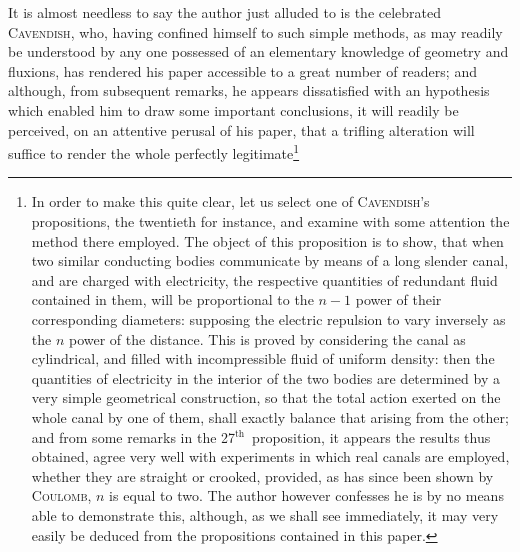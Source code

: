 \documentclass[12pt,notitlepage]{amsart}
\let\Person\textsc
\def\th{${}^\text{th}$\ }
\begin{document}
It is almost needless to say the author just alluded to is the celebrated
\Person{Cavendish}, who, having confined himself to such simple methods, as may
readily be understood by any one possessed of an elementary knowledge of
geometry and fluxions, has rendered his paper accessible to a great number
of readers; and although, from subsequent remarks, he appears dissatisfied
with an hypothesis which enabled him to draw some important conclusions,
it will readily be perceived, on an attentive perusal of his paper, that a trifling
alteration will suffice to render the whole perfectly legitimate\footnote{
In order to make this quite clear, let us select one of
\Person{Cavendish}'s propositions,
the twentieth for instance, and examine with some attention the method
there employed.
The object of this proposition is to show,
that when two similar conducting bodies communicate
by means of a long slender canal, and are charged with electricity,
the respective quantities of redundant fluid contained in them,
will be proportional to the $n-1$
power of their corresponding diameters:
supposing the electric repulsion to vary inversely
as the $n$ power of the distance.
This is proved by considering the canal as cylindrical,
and filled with incompressible fluid of uniform density:
then the quantities of electricity
in the interior of the two bodies are determined by a very simple
geometrical construction, so that the total action exerted
on the whole canal by one of them, shall exactly
balance that arising from the other; and from some remarks
in the 27\th proposition, it
appears the results thus obtained, agree very well with
experiments in which real canals
are employed, whether they are straight or crooked,
provided, as has since been shown
by \Person{Coulomb}, $n$ is equal to two.
The author however confesses he is by no means able
to demonstrate this, although, as we shall see immediately,
it may very easily be deduced
from the propositions contained in this paper.

}
\end{document}
